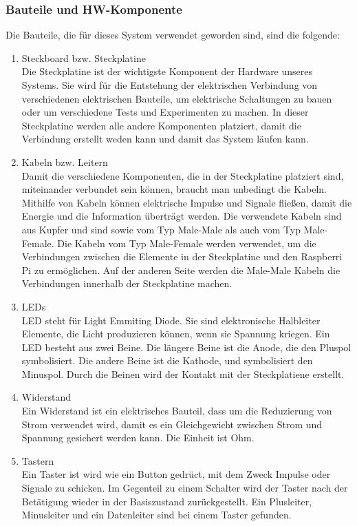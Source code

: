 		\subsubsection{Bauteile und HW-Komponente}Die Bauteile, die für dieses System verwendet geworden sind, sind die folgende:
\begin{enumerate}
	\item Steckboard bzw. Steckplatine \\
Die Steckplatine ist der wichtigste Komponent der Hardware unseres Systems. Sie wird für die Entstehung der elektrischen Verbindung von verschiedenen elektrischen Bauteile, um elektrische Schaltungen zu bauen oder um verschiedene Tests und Experimenten zu machen. In dieser Steckplatine werden alle andere Komponenten platziert, damit die Verbindung erstellt weden kann und damit das System läufen kann.
	\item Kabeln bzw. Leitern \\
Damit die verschiedene Komponenten, die in der Steckplatine platziert sind, miteinander verbundet sein können, braucht man unbedingt die Kabeln. Mithilfe von Kabeln können elektrische Impulse und Signale fließen, damit die Energie und die Information überträgt werden. Die verwendete Kabeln sind aus Kupfer und sind sowie vom Typ Male-Male als auch vom Typ Male-Female. Die Kabeln vom Typ Male-Female werden verwendet, um die Verbindungen zwischen die Elemente in der Steckplatine und den Raspberri Pi zu ermöglichen. Auf der anderen Seite werden die Male-Male Kabeln die Verbindungen innerhalb der Steckplatine machen.
	\item LEDs \\
LED steht für Light Emmiting Diode. Sie sind elektronische Halbleiter Elemente, die Licht produzieren können, wenn sie Spannung kriegen. Ein LED besteht aus zwei Beine. Die längere Beine ist die Anode, die den Pluspol symbolisiert. Die andere Beine ist die Kathode, und symbolisiert den Minuspol. Durch die Beinen wird der Kontakt mit der Steckplatiene erstellt.
	\item Widerstand \\
Ein Widerstand ist ein elektrisches Bauteil, dass um die Reduzierung von Strom verwendet wird, damit es ein Gleichgewicht zwischen Strom und Spannung gesichert werden kann. Die Einheit ist Ohm.
	\item Tastern \\
Ein Taster ist wird wie ein Button gedrüct, mit dem Zweck Impulse oder Signale zu schicken. Im Gegenteil zu einem Schalter wird der Taster nach der Betätigung  wieder in der Basiszustand zurückgestellt. Ein Plusleiter, Minusleiter und ein Datenleiter sind bei einem Taster gefunden.

\end{enumerate}
